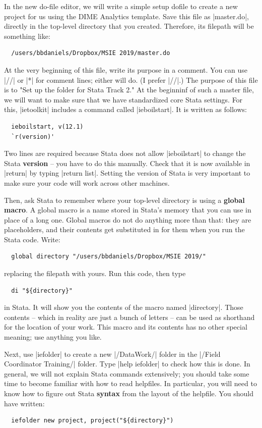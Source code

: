 \documentclass{tufte-handout}
\begin{document}
In the new do-file editor, we will write a simple setup dofile
to create a new project for us using the DIME Analytics template.
Save this file as |master.do|, directly in the top-level directory
that you created. Therefore, its filepath will be something like:
\begin{Verbatim}
  /users/bbdaniels/Dropbox/MSIE 2019/master.do
\end{Verbatim}
At the very beginning of this file, write its purpose in a comment.
You can use |//| or |*| for comment lines; either will do. (I prefer |//|.)
The purpose of this file is to "Set up the folder for Stata Track 2."
At the beginninf of such a master file, we will want to make sure
that we have standardized core Stata settings.
For this, |ietoolkit| includes a command called |ieboilstart|.
It is written as follows:
\begin{Verbatim}
  ieboilstart, v(12.1)
  `r(version)'
\end{Verbatim}
Two lines are required because Stata does not allow |ieboilstart|
to change the Stata \textbf{version} – you have to do this manually.
Check that it is now available in |return| by typing |return list|.
Setting the version of Stata is very important to make sure
your code will work across other machines.

Then, ask Stata to remember where your top-level directory is
using a \textbf{global macro}. A global macro is a name
stored in Stata's memory that you can use in place of a long one.
Global macros do not do anything more than that:
they are placeholders, and their contents get substituted in for them
when you run the Stata code. Write:
\begin{Verbatim}
  global directory "/users/bbdaniels/Dropbox/MSIE 2019/"
\end{Verbatim}
replacing the filepath with yours.
Run this code, then type
\begin{Verbatim}
  di "${directory}"
\end{Verbatim}
in Stata. It will show you the contents of the macro named |directory|.
Those contents -- which in reality are just a bunch of letters --
can be used as shorthand for the location of your work.
This macro and its contents has no other special meaning; use anything you like.

Next, use |iefolder|
to create a new |/DataWork/| folder in the |/Field Coordinator Training/| folder.
Type |help iefolder| to check how this is done.
In general, we will not explain Stata commands extensively;
you should take some time to become familiar with how to read helpfiles.
In particular, you will need to know how to figure out Stata \textbf{syntax}
from the layout of the helpfile.
You should have written:
\begin{Verbatim}
  iefolder new project, project("${directory}")
\end{Verbatim}
\end{document}
